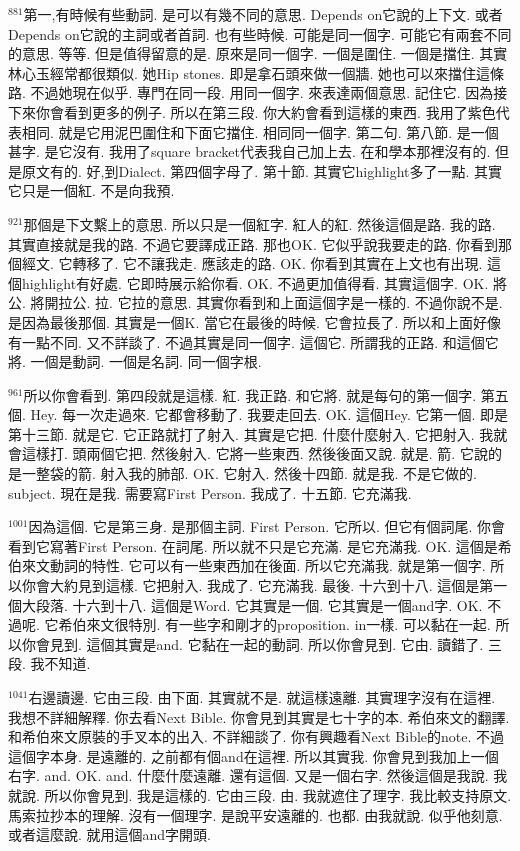 \documentclass{book}
\begin{document}
$^{881}$第一,有時候有些動詞.
是可以有幾不同的意思.
Depends on它說的上下文.
或者Depends on它說的主詞或者首詞.
也有些時候.
可能是同一個字.
可能它有兩套不同的意思.
等等.
但是值得留意的是.
原來是同一個字.
一個是圍住.
一個是擋住.
其實林心玉經常都很類似.
她Hip stones.
即是拿石頭來做一個牆.
她也可以來擋住這條路.
不過她現在似乎.
專門在同一段.
用同一個字.
來表達兩個意思.
記住它.
因為接下來你會看到更多的例子.
所以在第三段.
你大約會看到這樣的東西.
我用了紫色代表相同.
就是它用泥巴圍住和下面它擋住.
相同同一個字.
第二句.
第八節.
是一個甚字.
是它沒有.
我用了square bracket代表我自己加上去.
在和學本那裡沒有的.
但是原文有的.
好,到Dialect.
第四個字母了.
第十節.
其實它highlight多了一點.
其實它只是一個紅.
不是向我預.

$^{921}$那個是下文繫上的意思.
所以只是一個紅字.
紅人的紅.
然後這個是路.
我的路.
其實直接就是我的路.
不過它要譯成正路.
那也OK.
它似乎說我要走的路.
你看到那個經文.
它轉移了.
它不讓我走.
應該走的路.
OK.
你看到其實在上文也有出現.
這個highlight有好處.
它即時展示給你看.
OK.
不過更加值得看.
其實這個字.
OK.
將公.
將開拉公.
拉.
它拉的意思.
其實你看到和上面這個字是一樣的.
不過你說不是.
是因為最後那個.
其實是一個K.
當它在最後的時候.
它會拉長了.
所以和上面好像有一點不同.
又不詳談了.
不過其實是同一個字.
這個它.
所謂我的正路.
和這個它將.
一個是動詞.
一個是名詞.
同一個字根.

$^{961}$所以你會看到.
第四段就是這樣.
紅.
我正路.
和它將.
就是每句的第一個字.
第五個.
Hey.
每一次走過來.
它都會移動了.
我要走回去.
OK.
這個Hey.
它第一個.
即是第十三節.
就是它.
它正路就打了射入.
其實是它把.
什麼什麼射入.
它把射入.
我就會這樣打.
頭兩個它把.
然後射入.
它將一些東西.
然後後面又說.
就是.
箭.
它說的是一整袋的箭.
射入我的肺部.
OK.
它射入.
然後十四節.
就是我.
不是它做的.
subject.
現在是我.
需要寫First Person.
我成了.
十五節.
它充滿我.

$^{1001}$因為這個.
它是第三身.
是那個主詞.
First Person.
它所以.
但它有個詞尾.
你會看到它寫著First Person.
在詞尾.
所以就不只是它充滿.
是它充滿我.
OK.
這個是希伯來文動詞的特性.
它可以有一些東西加在後面.
所以它充滿我.
就是第一個字.
所以你會大約見到這樣.
它把射入.
我成了.
它充滿我.
最後.
十六到十八.
這個是第一個大段落.
十六到十八.
這個是Word.
它其實是一個.
它其實是一個and字.
OK.
不過呢.
它希伯來文很特別.
有一些字和剛才的proposition.
in一樣.
可以黏在一起.
所以你會見到.
這個其實是and.
它黏在一起的動詞.
所以你會見到.
它由.
讀錯了.
三段.
我不知道.

$^{1041}$右邊讀邊.
它由三段.
由下面.
其實就不是.
就這樣遠離.
其實理字沒有在這裡.
我想不詳細解釋.
你去看Next Bible.
你會見到其實是七十字的本.
希伯來文的翻譯.
和希伯來文原裝的手叉本的出入.
不詳細談了.
你有興趣看Next Bible的note.
不過這個字本身.
是遠離的.
之前都有個and在這裡.
所以其實我.
你會見到我加上一個右字.
and.
OK.
and.
什麼什麼遠離.
還有這個.
又是一個右字.
然後這個是我說.
我就說.
所以你會見到.
我是這樣的.
它由三段.
由.
我就遮住了理字.
我比較支持原文.
馬索拉抄本的理解.
沒有一個理字.
是說平安遠離的.
也都.
由我就說.
似乎他刻意.
或者這麼說.
就用這個and字開頭.
\end{document}
